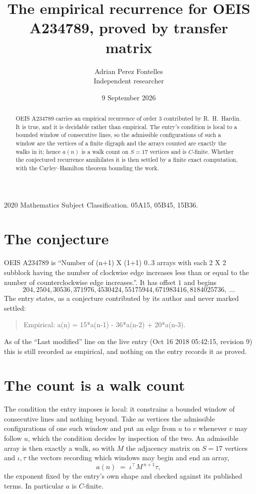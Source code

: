\documentclass[11pt,a4paper]{article}
\title{The empirical recurrence for OEIS A234789, proved by transfer matrix}
\author{Adrian Perez Fontelles\\ \small Independent researcher}
\date{9 September 2026}
\theoremstyle{plain}
\theoremstyle{definition}
\begin{document}
\maketitle

\begin{abstract}
OEIS A234789 carries an empirical recurrence of order $3$ contributed by R.~H.~Hardin. It is
true, and it is decidable rather than empirical. The entry's condition is local to a bounded window of consecutive lines, so
the admissible configurations of such a window are the vertices of a finite digraph and the
arrays counted are exactly the walks in it; hence $a(n)$ is a walk count on $S=17$ vertices
and is $C$-finite. Whether the conjectured recurrence annihilates it is then settled by a
finite exact computation, with the Cayley--Hamilton theorem bounding the work.
\end{abstract}

\noindent\small 2020 Mathematics Subject Classification. 05A15, 05B45, 15B36.\normalsize

\section{The conjecture}

OEIS A234789 is ``Number of (n+1) X (1+1) 0..3 arrays with each 2 X 2 subblock having the number of clockwise edge increases less than or equal to the number of counterclockwise edge increases.''. It has offset $1$ and begins
\[
204, 2504, 30536, 371976, 4530424, 55175944, 671983416, 8184025736,\ \dots
\]
The entry states, as a conjecture contributed by its author and never marked settled:
\begin{quote}
Empirical: a(n) = 15*a(n-1) - 36*a(n-2) + 20*a(n-3).
\end{quote}
As of the ``Last modified'' line on the live entry (Oct 16 2018 05:42:15, revision 9) this is still
recorded as empirical, and nothing on the entry records it as proved.

\section{The count is a walk count}

The condition the entry imposes is local: it constrains a bounded window of consecutive lines and nothing beyond. Take as
vertices the admissible configurations of one such window and put an edge from $u$ to $v$
whenever $v$ may follow $u$, which the condition decides by inspection of the two. An
admissible array is then exactly a walk, so with $M$ the adjacency matrix on $S=17$ vertices
and $\iota,\tau$ the vectors recording which windows may begin and end an array,
\[
a(n)\;=\;\iota^{\!\top}M^{\,n+1}\tau ,
\]
the exponent fixed by the entry's own shape and checked against its published terms. In
particular $a$ is $C$-finite.
\end{document}
